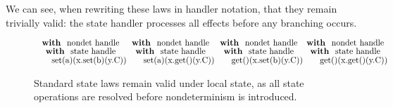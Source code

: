 \documentclass[logo,bsc,singlespacing,parskip]{infthesis}
\begin{document}
We can see, when rewriting these laws in handler notation, that they remain trivially valid: the state handler processes all effects before any branching occurs.
\begin{figure}[H]

\centering

\vspace{-0.0em}
\[
\begin{array}{@{}l@{}l@{}l@{}l@{}}
\shortstack{
  \textbf{with } \text{nondet handle} \\
  \textbf{with } \text{state handle} \\
  \quad\quad\text{set(a)(x.set(b)(y.C))}
}
&
\shortstack{
  \textbf{with } \text{nondet handle} \\
  \textbf{with } \text{state handle} \\
  \quad\quad\text{set(a)(x.get()(y.C))}
}
&
\shortstack{
  \textbf{with } \text{nondet handle} \\
  \textbf{with } \text{state handle} \\
  \quad\quad\text{get()(x.set(b)(y.C))}
}
&
\shortstack{
  \textbf{with } \text{nondet handle} \\
  \textbf{with } \text{state handle} \\
  \quad\quad\text{get()(x.get()(y.C))}
}
\end{array}
\]
\caption{Standard state laws remain valid under local state, as all state operations are resolved before nondeterminism is introduced.}
\label{fig:local-state-laws}
\end{figure}
\end{document}
